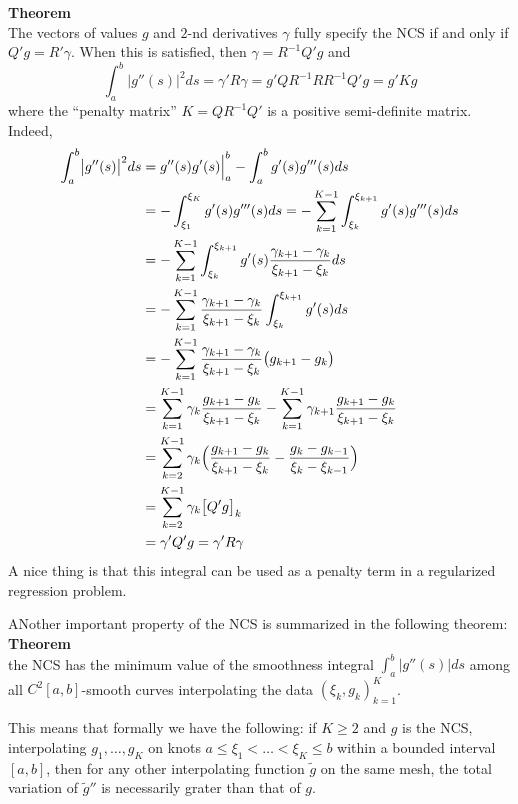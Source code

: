 \documentclass[a4paper]{article}
\newcommand{\abs}[1]{{\left | #1 \right |}}
\begin{document}
\noindent\textbf{Theorem}\hfill \\
The vectors of values $g$ and $2$-nd derivatives $\gamma$ fully specify the NCS
if and only if $Q'g = R'\gamma$. When this is satisfied, then $\gamma = R^{-1}Q'g$ and
\[
\int_a^b \abs{g''(s)}^2 ds
= \gamma' R \gamma
= g' Q R^{-1} R R^{-1} Q' g
= g' K g
\]
where the ``penalty matrix'' $K = Q R^{-1} Q'$ is a positive semi-definite matrix. Indeed,
\begin{align*}
	\int_a^b \bigl|g''(s)\bigr|^2 ds
	&= \Bigl. g''(s) g'(s) \Bigr\rvert_a^b - \int_a^b g'(s) g'''(s) ds \\
	&= - \int_{\xi_1}^{\xi_K} g'(s) g'''(s) ds
		= - \sum_{k=1}^{K-1} \int_{\xi_k}^{\xi_{k+1}} g'(s) g'''(s) ds\\
	&= - \sum_{k=1}^{K-1} \int_{\xi_k}^{\xi_{k+1}} g'(s) \frac{\gamma_{k+1}-\gamma_k}{\xi_{k+1}-\xi_k} ds\\
	&= - \sum_{k=1}^{K-1} \frac{\gamma_{k+1}-\gamma_k}{\xi_{k+1}-\xi_k} \int_{\xi_k}^{\xi_{k+1}} g'(s) ds\\
	&= - \sum_{k=1}^{K-1} \frac{\gamma_{k+1}-\gamma_k}{\xi_{k+1}-\xi_k} \bigl(g_{k+1}-g_k\bigr)\\
	&= \sum_{k=1}^{K-1} \gamma_k\frac{g_{k+1}-g_k}{\xi_{k+1}-\xi_k}
		- \sum_{k=1}^{K-1} \gamma_{k+1}\frac{g_{k+1}-g_k}{\xi_{k+1}-\xi_k}\\
	&= \sum_{k=2}^{K-1} \gamma_k \Bigl(\frac{g_{k+1}-g_k}{\xi_{k+1}-\xi_k} - \frac{g_k-g_{k-1}}{\xi_k-\xi_{k-1}} \Bigr)\\
	&= \sum_{k=2}^{K-1} \gamma_k \bigl[Q'g\bigr]_k\\
	&= \gamma' Q' g = \gamma' R \gamma
\end{align*}
A nice thing is that this integral can be used as a penalty term in a regularized
regression problem.

ANother important property of the NCS is summarized in the following theorem:
\noindent \textbf{Theorem}\hfill\\
the NCS has the minimum value of the smoothness integral $\int_a^b |g''(s)| ds$
among all $C^2[a,b]$-smooth curves interpolating the data $(\xi_k, g_k)_{k=1}^K$.

This means that formally we have the following: if $K\geq 2$ and $g$ is the NCS,
interpolating $g_1,\ldots,g_K$ on knots $a\leq \xi_1 <\ldots<\xi_K\leq b$ within
a bounded interval $[a,b]$, then for any other interpolating function $\tilde{g}$
on the same mesh, the total variation of $\tilde{g}''$ is necessarily grater than
that of $g$.
\end{document}
